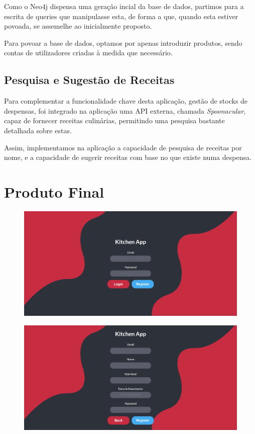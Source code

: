 \documentclass[a4paper]{report}
\begin{document}
    Como o Neo4j dispensa uma geração incial da base de dados, partimos para a
    escrita de queries que manipulasse esta, de forma a que, quando esta estiver
    povoada, se assemelhe ao inicialmente proposto.

    Para povoar a base de dados, optamos por apenas introduzir produtos, sendo
    contas de utilizadores criadas à medida que necessário.

    \section{Pesquisa e Sugestão de Receitas}
    Para complementar a funcionalidade chave desta aplicação, gestão de stocks
    de despensas, foi integrado na aplicação uma API externa, chamada
    \textit{Spoonacular}, capaz de fornecer receitas culinárias, permitindo uma
    pesquisa bastante detalhada sobre estas.

    Assim, implementamos na aplicação a capacidade de pesquisa de receitas por
    nome, e a capacidade de sugerir receitas com base no que existe numa
    despensa.

\chapter{Produto Final}
    \begin{figure}[H]
        \centering
            \includegraphics[width=\textwidth]{images/produto_final/login.png}
    \end{figure}

    \begin{figure}[H]
        \centering
            \includegraphics[width=\textwidth]{images/produto_final/registo.png}
    \end{figure}
\end{document}
